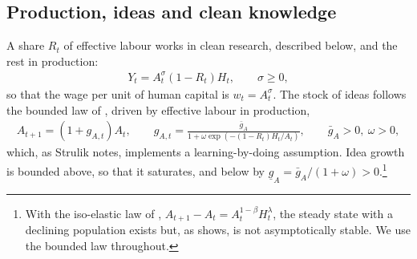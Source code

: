 \documentclass[11pt]{article}
\begin{document}
\subsection{Production, ideas and clean knowledge}
A share $R_t$ of effective labour works in clean research, described below, and the rest in production:
\begin{align}
Y_t=A_t^{\sigma}(1-R_t)H_t,\qquad \sigma\ge0,
\label{eq:Y_hab}
\end{align}
so that the wage per unit of human capital is $w_t=A_t^{\sigma}$. The stock of ideas follows the bounded
law of \citet{STRULIK2024104943}, driven by effective labour in production,
\begin{align}
A_{t+1}=(1+g_{A,t})A_t,
\qquad
g_{A,t}=\frac{\bar g_A}{1+\omega\exp\!\left(-(1-R_t)H_t/A_t\right)},
\qquad \bar g_A>0,\ \omega>0,
\label{eq:gA_logistic}
\end{align}
which, as Strulik notes, implements a learning-by-doing assumption. Idea growth is bounded above,
so that it saturates, and below by $\underline g_A=\bar g_A/(1+\omega)>0$.\footnote{With the
iso-elastic law of \citet{jones22}, $A_{t+1}-A_t=A_t^{1-\beta}H_t^{\lambda}$, the steady state with a
declining population exists but, as \citet[Section~2.5]{STRULIK2024104943} shows, is not
asymptotically stable. We use the bounded law throughout.}
\end{document}
